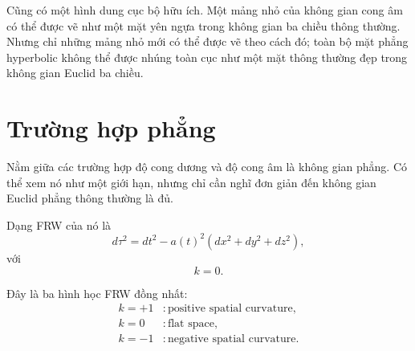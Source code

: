 Cũng có một hình dung cục bộ hữu ích. Một mảng nhỏ của không gian cong âm có thể được vẽ như một mặt yên ngựa trong không gian ba chiều thông thường. Nhưng chỉ những mảng nhỏ mới có thể được vẽ theo cách đó; toàn bộ mặt phẳng hyperbolic không thể được nhúng toàn cục như một mặt thông thường đẹp trong không gian Euclid ba chiều.

\section{Trường hợp phẳng}

Nằm giữa các trường hợp độ cong dương và độ cong âm là không gian phẳng. Có thể xem nó như một giới hạn, nhưng chỉ cần nghĩ đơn giản đến không gian Euclid phẳng thông thường là đủ.

Dạng FRW của nó là
\begin{equation}
d\tau^2=dt^2-a(t)^2\left(dx^2+dy^2+dz^2\right),
\end{equation}
với
\begin{equation}
k=0.
\end{equation}

Đây là ba hình học FRW đồng nhất:
\begin{align}
k=+1 &: \text{positive spatial curvature},\\
k=0 &: \text{flat space},\\
k=-1 &: \text{negative spatial curvature}.
\end{align}

\begin{classroomqa}
\end{classroomqa}

\begin{classroomqa}
\end{classroomqa}

